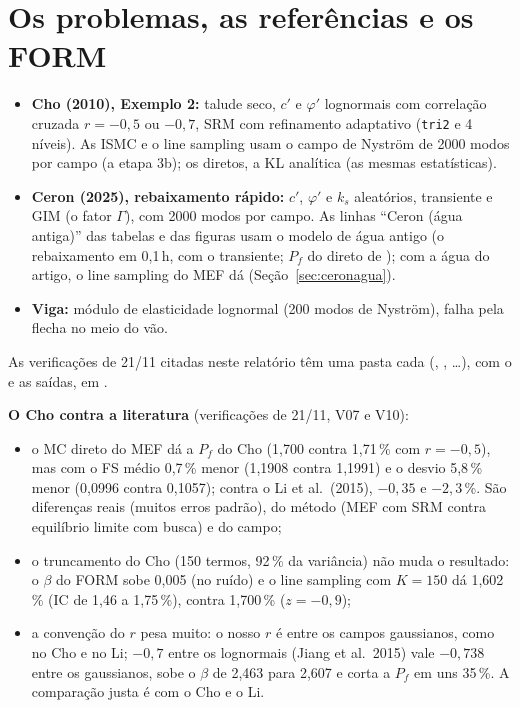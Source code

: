 \documentclass[11pt,a4paper]{article}
\begin{document}
\section{Os problemas, as referências e os FORM}\label{sec:problemas}
\begin{itemize}
  \item \textbf{Cho (2010), Exemplo 2:} talude seco, $c'$ e $\varphi'$ lognormais com correlação cruzada $r = -0{,}5$ ou
    $-0{,}7$, SRM com refinamento adaptativo (\texttt{tri2} e 4 níveis). As ISMC e o line sampling usam o campo de Nyström
    de 2000 modos por campo (a etapa 3b); os diretos, a KL analítica (as mesmas estatísticas).
  \item \textbf{Ceron (2025), rebaixamento rápido:} $c'$, $\varphi'$ e $k_s$ aleatórios, transiente e GIM (o fator
    $\Gamma$), com 2000 modos por campo. As linhas ``Ceron (água antiga)'' das tabelas e das figuras usam o modelo de
    água antigo (o rebaixamento em 0,1\,h, com o transiente; $P_f$ do direto de ); com a água do artigo, o
    line sampling do MEF dá \ceaLsPf{} (Seção~\ref{sec:ceronagua}).
  \item \textbf{Viga:} módulo de elasticidade lognormal (200 modos de Nyström), falha pela flecha no meio do vão.
\end{itemize}
{\sloppy As verificações de 21/11 citadas neste relatório têm uma pasta cada (, , \ldots),
com o  e as saídas, em
.\par}

\textbf{O Cho contra a literatura} (verificações de 21/11, V07 e V10):
\begin{itemize}
  \item o MC direto do MEF dá a $P_f$ do Cho (1,700 contra 1,71\,\% com $r = -0{,}5$), mas com o FS médio 0,7\,\% menor
    (1,1908 contra 1,1991) e o desvio 5,8\,\% menor (0,0996 contra 0,1057); contra o Li et al.\ (2015), $-0{,}35$ e
    $-2{,}3$\,\%. São diferenças reais (muitos erros padrão), do método (MEF com SRM contra equilíbrio limite com busca)
    e do campo;
  \item o truncamento do Cho (150 termos, 92\,\% da variância) não muda o resultado: o $\beta$ do FORM sobe 0,005 (no
    ruído) e o line sampling com $K = 150$ dá 1,602\,\% (IC de 1,46 a 1,75\,\%), contra 1,700\,\% ($z = -0{,}9$);
  \item a convenção do $r$ pesa muito: o nosso $r$ é entre os campos gaussianos, como no Cho e no Li; $-0{,}7$ entre os
    lognormais (Jiang et al.\ 2015) vale $-0{,}738$ entre os gaussianos, sobe o $\beta$ de 2,463 para 2,607 e corta a
    $P_f$ em uns 35\,\%. A comparação justa é com o Cho e o Li.
\end{itemize}
\end{document}
